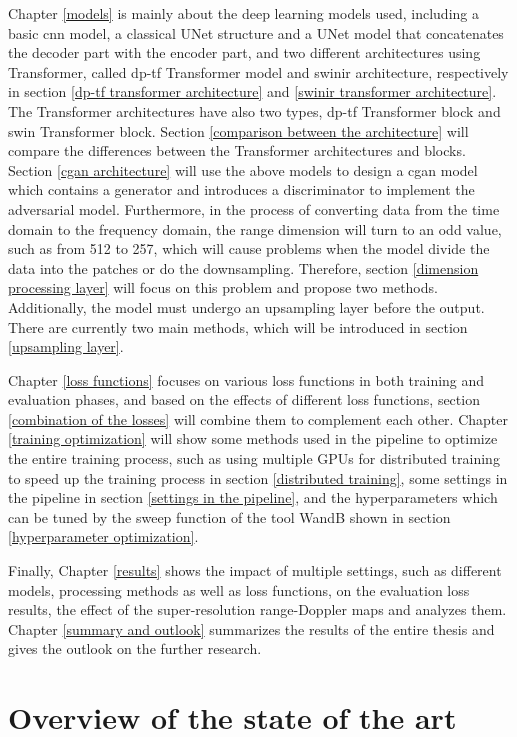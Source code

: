 Chapter \ref{models} is mainly about the deep learning models used, including a basic \gls{cnn} model, a classical UNet structure and a UNet model that concatenates the decoder part with the encoder part, and two different architectures using Transformer, called \gls{dp}-\gls{tf} Transformer model and \gls{swinir} architecture, respectively in section \ref{dp-tf transformer architecture} and \ref{swinir transformer architecture}. The Transformer architectures have also two types, \gls{dp}-\gls{tf} Transformer block and \gls{swin} Transformer block. Section \ref{comparison between the architecture} will compare the differences between the Transformer architectures and blocks. Section \ref{cgan architecture} will use the above models to design a \gls{cgan} model which contains a generator and introduces a discriminator to implement the adversarial model. Furthermore, in the process of converting data from the time domain to the frequency domain, the range dimension will turn to an odd value, such as from 512 to 257, which will cause problems when the model divide the data into the patches or do the downsampling. Therefore, section \ref{dimension processing layer} will focus on this problem and propose two methods. Additionally, the model must undergo an upsampling layer before the output. There are currently two main methods, which will be introduced in section \ref{upsampling layer}.

Chapter \ref{loss functions} focuses on various loss functions in both training and evaluation phases, and based on the effects of different loss functions, section \ref{combination of the losses} will combine them to complement each other. Chapter \ref{training optimization} will show some methods used in the pipeline to optimize the entire training process, such as using multiple GPUs for distributed training to speed up the training process in section \ref{distributed training}, some settings in the pipeline in section \ref{settings in the pipeline}, and the hyperparameters which can be tuned by the sweep function of the tool WandB shown in section \ref{hyperparameter optimization}.

Finally, Chapter \ref{results} shows the impact of multiple settings, such as different models, processing methods as well as loss functions, on the evaluation loss results, the effect of the super-resolution range-Doppler maps and analyzes them. Chapter \ref{summary and outlook} summarizes the results of the entire thesis and gives the outlook on the further research.

\section{Overview of the state of the art} \label{overview of the state of the art}

